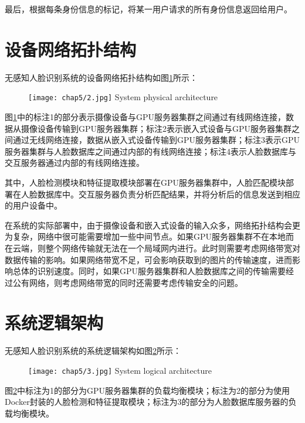 最后，根据每条身份信息的标记，将某一用户请求的所有身份信息返回给用户。

\section{设备网络拓扑结构}

无感知人脸识别系统的设备网络拓扑结构如图\ref{fig:chap5:phy}所示：

\begin{figure}[!htp]
	\centering
	\texttt{[image: chap5/2.jpg]}
	{System physical architecture}
	\label{fig:chap5:phy}
\end{figure}

图\ref{fig:chap5:phy}中的标注1的部分表示摄像设备与GPU服务器集群之间通过有线网络连接，数据从摄像设备传输到GPU服务器集群；标注2表示嵌入式设备与GPU服务器集群之间通过无线网络连接，数据从嵌入式设备传输到GPU服务器集群；标注3表示GPU服务器集群与人脸数据库之间通过内部的有线网络连接；标注4表示人脸数据库与交互服务器通过内部的有线网络连接。

其中，人脸检测模块和特征提取模块部署在GPU服务器集群中，人脸匹配模块部署在人脸数据库中。交互服务器负责分析匹配结果，并将分析后的信息发送到相应的用户设备中。

在系统的实际部署中，由于摄像设备和嵌入式设备的输入众多，网络拓扑结构会更为复杂，网络中很可能需要增加一些中间节点。如果GPU服务器集群不在本地而在云端，则整个网络传输就无法在一个局域网内进行。此时则需要考虑网络带宽对数据传输的影响。如果网络带宽不足，可会影响获取到的图片的传输速度，进而影响总体的识别速度。同时，如果GPU服务器集群和人脸数据库之间的传输需要经过公有网络，则考虑网络带宽的同时还需要考虑传输安全的问题。


\section{系统逻辑架构}

无感知人脸识别系统的系统逻辑架构如图\ref{fig:chap5:logic}所示：

\begin{figure}[!htp]
	\centering
	\texttt{[image: chap5/3.jpg]}
	{System logical architecture}
	\label{fig:chap5:logic}
\end{figure}

图\ref{fig:chap5:logic}中标注为1的部分为GPU服务器集群的负载均衡模块；标注为2的部分为使用Docker封装的人脸检测和特征提取模块；标注为3的部分为人脸数据库服务器的负载均衡模块。

